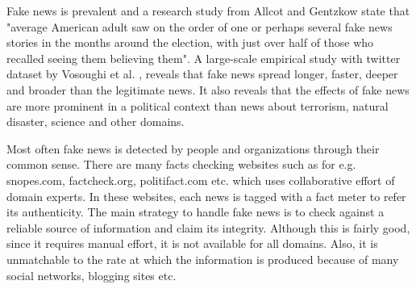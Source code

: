 \documentclass[a4paper, 11pt]{article}
\begin{document}
Fake news is prevalent and a research study from Allcot and Gentzkow \cite{Allcott2017} state that "average American adult saw on the order of one or perhaps several fake news stories in the months around the election, with just over half of those who recalled seeing them believing them". A large-scale empirical study with twitter dataset by Vosoughi et al. \cite{Vosoughi1146}, reveals that fake news spread longer, faster, deeper and broader than the legitimate news. It also reveals that the effects of fake news are more prominent in a political context than news about terrorism, natural disaster, science and other domains.

Most often fake news is detected by people and organizations through their common sense. There are many facts checking websites such as for e.g. snopes.com, factcheck.org, politifact.com etc. which uses collaborative effort of domain experts. In these websites, each news is tagged with a fact meter to refer its authenticity. The main strategy to handle fake news is to check against a reliable source of information and claim its integrity. Although this is fairly good, since it requires manual effort, it is not available for all domains. Also, it is unmatchable to the rate at which the information is produced because of many social networks, blogging sites etc.
\end{document}
